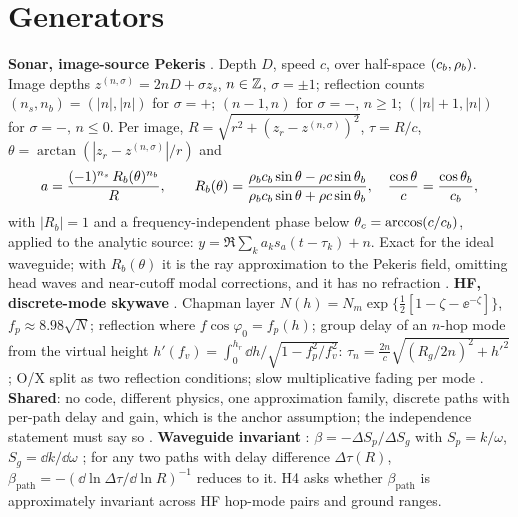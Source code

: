 \documentclass[10pt,a4paper]{article}
\begin{document}
\section{Generators}
\textbf{Sonar, image-source Pekeris} \tagP{}. Depth $D$, speed $c$, over half-space $(c_{b},\rho_{b})$. Image depths $z^{(n,\sigma)}=2nD+\sigma z_s$, $n\in\mathbb{Z}$, $\sigma=\pm1$; reflection counts $(n_s,n_b)=(|n|,|n|)$ for $\sigma=+$; $(n-1,n)$ for $\sigma=-,\,n\ge1$; $(|n|+1,|n|)$ for $\sigma=-,\,n\le0$. Per image, $R=\sqrt{r^2+(z_r-z^{(n,\sigma)})^2}$, $\tau=R/c$, $\theta=\arctan(|z_r-z^{(n,\sigma)}|/r)$ and
\begin{equation}
  a=\frac{(-1)^{n_s}\,R_b(\theta)^{n_b}}{R},\qquad
  R_b(\theta)=\frac{\rho_{b}c_{b}\sin\theta-\rho c\sin\theta_b}{\rho_{b}c_{b}\sin\theta+\rho c\sin\theta_b},\quad
  \frac{\cos\theta}{c}=\frac{\cos\theta_b}{c_{b}},
\end{equation}
with $|R_b|=1$ and a frequency-independent phase below $\theta_c=\arccos(c/c_{b})$, applied to the analytic source: $y=\Re\sum_ka_ks_a(t-\tau_k)+n$. Exact for the ideal waveguide; with $R_b(\theta)$ it is the ray approximation to the Pekeris field, omitting head waves and near-cutoff modal corrections, and it has no refraction \citep{pekeris1948,jensen2011}. \textbf{HF, discrete-mode skywave} \tagP{}. Chapman layer $N(h)=N_m\exp\{\tfrac12[1-\zeta-\ee^{-\zeta}]\}$, $f_p\approx8.98\sqrt N$; reflection where $f\cos\varphi_0=f_p(h)$; group delay of an $n$-hop mode from the virtual height $h'(f_v)=\int_0^{h_r}\dd h/\sqrt{1-f_p^2/f_v^2}$: $\tau_n=\tfrac{2n}{c}\sqrt{(R_g/2n)^2+h'^2}$; O/X split as two reflection conditions; slow multiplicative fading per mode \citep{davies1990}. \textbf{Shared}: no code, different physics, one approximation family, discrete paths with per-path delay and gain, which is the anchor assumption; the independence statement must say so \tagG{}. \textbf{Waveguide invariant} \tagH{}: $\beta=-\Delta S_p/\Delta S_g$ with $S_p=k/\omega$, $S_g=\dd k/\dd\omega$ \citep{dspain1999}; for any two paths with delay difference $\Delta\tau(R)$, $\beta_{\mathrm{path}}=-(\dd\ln\Delta\tau/\dd\ln R)^{-1}$ reduces to it. H4 asks whether $\beta_{\mathrm{path}}$ is approximately invariant across HF hop-mode pairs and ground ranges.
\end{document}
